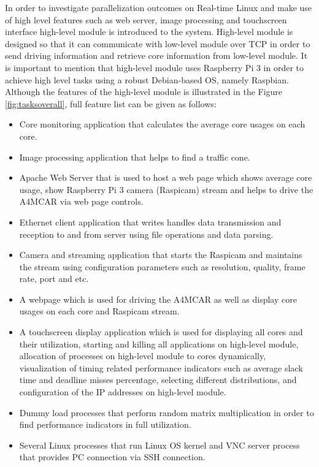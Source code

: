 In order to investigate parallelization outcomes on Real-time Linux and make use of high level features such as web server, image processing and touchscreen interface high-level module is introduced to the system. High-level module is designed so that it can communicate with low-level module over TCP in order to send driving information and retrieve core information from low-level module. It is important to mention that high-level module uses Raspberry Pi 3 in order to achieve high level tasks using a robust Debian-based OS, namely Raspbian. Although the features of the high-level module is illustrated in the Figure \ref{fig:tasksoverall}, full feature list can be given as follows:
\begin{itemize}
	\item Core monitoring application that calculates the average core usages on each core.
	\item Image processing application that helps to find a traffic cone.
	\item Apache Web Server that is used to host a web page which shows average core usage, show Raspberry Pi 3 camera (Raspicam) stream and helps to drive the A4MCAR via web page controls.
	\item Ethernet client application that writes handles data transmission and reception to and from server using file operations and data parsing.
	\item Camera and streaming application that starts the Raspicam and maintains the stream using configuration parameters such as resolution, quality, frame rate, port and etc.
	\item A webpage which is used for driving the A4MCAR as well as display core usages on each core and Raspicam stream.
	\item A touchscreen display application which is used for displaying all cores and their utilization, starting and killing all applications on high-level module, allocation of processes on high-level module to cores dynamically, visualization of timing related performance indicators such as average slack time and deadline misses percentage, selecting different distributions, and configuration of the IP addresses on high-level module.
	\item Dummy load processes that perform random matrix multiplication in order to find performance indicators in full utilization.
	\item Several Linux processes that run Linux OS kernel and VNC server process that provides PC connection via SSH connection.
\end{itemize}
